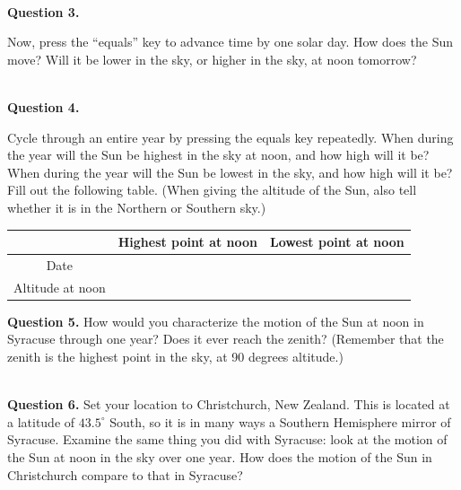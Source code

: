 \documentclass[11pt]{article}
\begin{document}
\vspace*{1.9cm}

\hrulefill\\
\noindent



\newpage
\textbf{Question 3.} 

Now, press the ``equals'' key to advance time by one solar day. How does the Sun move? Will it be lower in the sky, or 
higher in the sky, at noon tomorrow?

\vspace*{1.9cm}

\hrulefill\\
\textbf{Question 4.} 

Cycle through an entire year by pressing the equals key repeatedly. When during the year will the Sun be highest in the sky
at noon, and how high will it be? When during the year will the Sun be lowest in the sky, and how high will it be? Fill out 
the following table.
(When giving the altitude of the Sun, also tell whether it is in the Northern or Southern sky.) 
\renewcommand{\arraystretch}{2}

\vspace{1cm}
\begin{center}
\begin{tabular}{|c| c |c|}
\hline
 & Highest point at noon & Lowest point at noon \\
\hline
Date & & \\
\hline
Altitude at noon & & \\
\hline
\end{tabular}
\normalsize
\end{center}


\textbf{Question 5.} 
How would you characterize the motion of the Sun at noon in Syracuse through one year? Does it ever reach the zenith? (Remember that the zenith is the highest point in the sky, at 90 degrees altitude.)

\vspace*{2.5cm}
\hrulefill\\

\textbf{Question 6.}
Set your location to Christchurch, New Zealand. This is located at a latitude of $43.5^\circ$ South, so it is in many ways a Southern Hemisphere mirror of Syracuse. Examine the same thing you did with Syracuse: look at the motion of the 
Sun at noon in the sky over one year. How does the motion of the Sun in Christchurch compare to that in Syracuse?

\vspace*{2.5cm}
\hrulefill\\
\newpage
\end{document}
